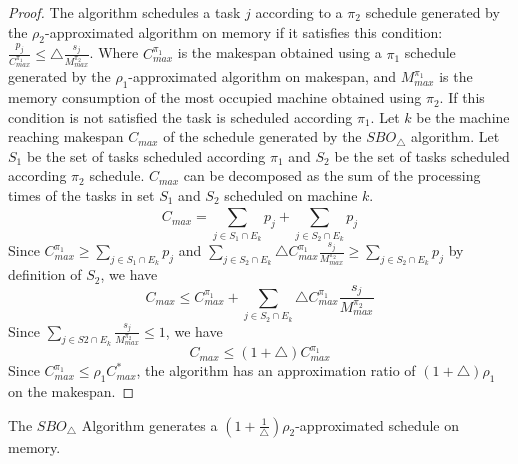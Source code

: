  \begin{proof}
The algorithm schedules a task $j$ according to a $\pi_2$ schedule generated by the $\rho_2$-approximated algorithm on memory if it satisfies  this condition: $\frac{{p_j}}{{C}^{\pi_1}_{max}} \leq \triangle \frac{s_j}{M^{\pi_2}_{max}}$.  Where ${C}^{\pi_1}_{max}$ is the makespan obtained using a $\pi_1$ schedule generated by the  $\rho_1$-approximated algorithm on makespan, and ${M}^{\pi_1}_{max}$ is the memory consumption of the most occupied machine obtained using $\pi_2$.  If this condition is not satisfied the task is scheduled according $\pi_1$.
 Let $k$ be the machine reaching makespan $C_{max}$ of the schedule generated by the $SBO_\triangle$ algorithm. Let  $S_1$ be the set of tasks scheduled according $\pi_1$ and $S_2$ be the set of tasks scheduled according $\pi_2$ schedule.  $C_{max}$ can be decomposed as the sum of the processing times of the tasks in set $S_1$ and $S_2$ scheduled on machine $k$.
                        \begin{equation}\nonumber
                  C_{max}= \sum_{j \in S_1 \cap E_k}^{}p_j+\sum_{j \in S_2 \cap E_k}^{}p_j 
                        \end{equation}                   
 Since $C^{\pi_1}_{max} \geq \sum\limits
                        _{j \in S_1 \cap E_k}^{}p_j$ and $\sum\limits
                        _{j \in S_2\cap E_k}\triangle {{C}^{\pi_1}_{max}} \frac{s_j}{M^{\pi_2}_{max}}\geq \sum\limits
                        _{j \in S_2\cap E_k}{p}_j $ by definition of $S_2$, we have
        \begin{equation}\nonumber
    C_{max}\leq C^{\pi_1}_{max}+\sum_{j \in S_2\cap E_k}^{}\triangle {{C}^{\pi_1}_{max}} \frac{s_j}{M^{\pi_2}_{max}}
                               \end{equation}        
      Since $\sum\limits_{j \in S2\cap E_k} \frac{s_j}{M^{\pi_2}_{max}}\leq 1$, we have
 \begin{equation}\nonumber                       C_{max}\leq(1+\triangle){C}^{\pi_1}_{max}                \end{equation}
Since ${C}^{\pi_1}_{max} \leq \rho_1 {C}^{*}_{max}$, the algorithm has an approximation ratio of $ (1+\triangle)  \rho_1$ on the makespan.
\end{proof}
\begin{property}\cite{10.1109/IPDPS.2008.4536292}
  The $SBO_\triangle$ Algorithm generates a $ (1+\frac{1}{\triangle})  \rho_2$-approximated schedule on memory.
  \end{property}         
